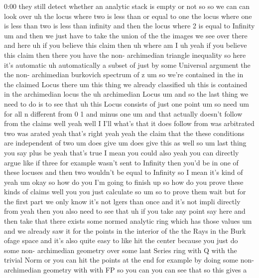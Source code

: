 \begin{unfinished}{0:00}
they  still  detect  whether  an  analytic
stack  is  empty  or  not  so  so  we  can  can
look
over  uh  the  locus  where  two  is  less  than
or  equal  to  one  the  locus  where  one  is
less  than  two  is  less  than  infinity  and
then  the  locus  where  2  is  equal  to
Infinity  um  and  then  we  just  have  to
take  the  union  of  the  the  images  we  see
over
there  and  here  uh  if  you  believe  this
claim  then
uh  where  am  I  uh  yeah  if  you  believe
this  claim  then  there  you  have  the  non-
archimedian  triangle  inequality  so  here
it's  automatic  uh  automatically  a  subset
of  just  by  some  Universal  argument  the
the  non-  archimedian  burkovich  spectrum
of
z  um  so  we're  contained  in  the  in  the
claimed  Locus
there  um  this  thing  we  already
classified  uh  this  is  contained  in  the
archimedian  locus  the  uh  archimedian
Locus  um  and  so  the  last  thing  we  need
to  do  is  to  see  that  uh  this  Locus
consists  of  just  one
point  um  so
need  um  for  all  n  different  from  0  1  and
minus
one  um  and  that  actually  doesn't  follow
from  the  claims  well
yeah  well  I
I'll  what's
that  it  does  follow  from  was
arbitrated  two  was  arated  yeah  that's
right  yeah  yeah  the  claim  that  the  these
conditions  are  independent  of  two  um
does  give  um  does  give  this  as  well  so
um  last  thing  you  say  plus  be  yeah
that's  true  I  mean  you  could  also  yeah
you  can  directly  argue  like  if  three  for
example  wasn't  sent  to  Infinity  then
you'd  be  in  one  of  these  locuses  and
then  two  wouldn't  be  equal  to  Infinity
so  I  mean  it's  kind  of
yeah  um  okay  so  how  do  you  I'm  going  to
finish  up  so  how  do  you  prove  these
kinds  of  claims  well  you  you  just
calculate  so  um  so  to  prove
them
wait  but  for  the  first  part  we  only  know
it's  not  lgers  than  once  and  it's  not
impli  directly  from  yeah  then  you  also
need  to  see  that  uh  if  you  take  any
point  say  here  and  then  take  that  there
exists  some  normed  analytic  ring
which  has  those  values  um  and  we  already
saw  it  for  the  points  in  the  interior  of
the  the  Rays  in  the  Burk  ofage  space  and
it's  also  quite  easy  to
like  hit  the  center  because  you  just  do
some  non-  archimedian  geometry  over  some
lant  Series  ring  with  Q  with  the  trivial
Norm  or  you  can  hit  the  points  at  the
end  for  example  by  doing  some  non-
archimedian  geometry  with  with  FP  so  you
can  you  can  see  that  so  this  gives  a

\end{unfinished}
